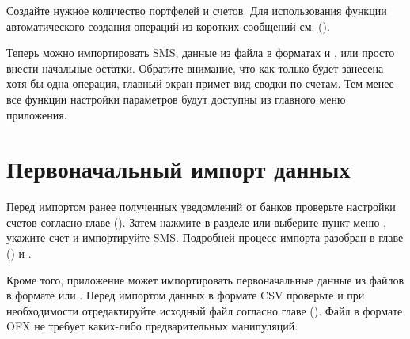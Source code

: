 \documentclass[a4paper,10pt,russian]{sphinxmanual}
\begin{document}
Создайте нужное количество портфелей и счетов. Для использования функции автоматического создания операций из коротких
сообщений см. {\hyperref[\detokenize{account-identities:chapter-account-identities}]{}} ().

Теперь можно импортировать SMS, данные из файла в форматах  и , или просто внести начальные остатки. Обратите внимание, что как только будет занесена хотя
бы одна операция, главный экран примет вид сводки по счетам. Тем менее все функции настройки параметров будут доступны из главного меню приложения.


\section{Первоначальный импорт данных}
\label{\detokenize{getting-started:id5}}
Перед импортом ранее полученных уведомлений от банков проверьте настройки счетов согласно главе {\hyperref[\detokenize{account-identities:chapter-account-identities}]{}} (). Затем нажмите 
в разделе  или выберите пункт меню , укажите счет
и импортируйте SMS. Подробней процесс импорта разобран в главе {\hyperref[\detokenize{import:chapter-import}]{}} () и .

Кроме того, приложение может импортировать первоначальные данные из файлов в формате  или . Перед импортом данных в формате CSV
проверьте и при необходимости отредактируйте исходный файл согласно главе {\hyperref[\detokenize{import:chapter-import}]{}} (). Файл в формате OFX не
требует каких-либо предварительных манипуляций.
\end{document}
